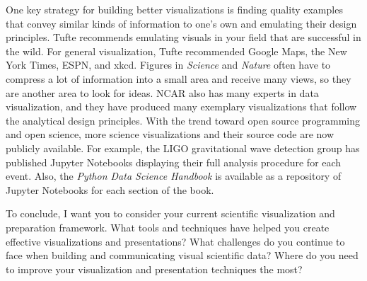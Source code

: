 \documentclass{tufte-handout}
\begin{document}
One key strategy for building better visualizations is finding quality examples that convey similar kinds of information to one's own and emulating their design principles. Tufte recommends emulating visuals in your field that are successful in the wild. For general visualization, Tufte recommended Google Maps, the New York Times, ESPN, and xkcd. Figures in \textit{Science} and \textit{Nature} often have to compress a lot of information into a small area and receive many views, so they are another area to look for ideas. NCAR also has many experts in data visualization, and they have produced many exemplary visualizations that follow the analytical design principles. With the trend toward open source programming and open science, more science visualizations and their source code are now publicly available. For example, the LIGO gravitational wave detection group has published Jupyter Notebooks displaying their full analysis procedure for each event. Also, the \textit{Python Data Science Handbook} is available as a repository of Jupyter Notebooks for each section of the book. 

To conclude, I want you to consider your current scientific visualization and preparation framework. What tools and techniques have helped you create effective visualizations and presentations? What challenges do you continue to face when building and communicating visual scientific data? Where do you need to improve your visualization and presentation techniques the most?  
\end{document}
